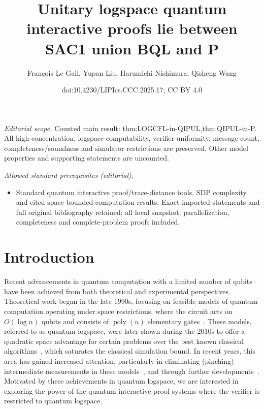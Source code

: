 \documentclass[10pt,a4paper]{article}
\title{Unitary logspace quantum interactive proofs lie between SAC1 union BQL and P}
\author{François Le Gall, Yupan Liu, Harumichi Nishimura, Qisheng Wang}
\date{doi:10.4230/LIPIcs.CCC.2025.17; CC BY 4.0}
\numberwithin{equation}{section}
\numberwithin{figure}{section}
\DeclareMathOperator\poly{poly}
\begin{document}
\maketitle
\noindent\textit{Editorial scope.} Counted main result: thm:LOGCFL-in-QIPUL,thm:QIPUL-in-P. All high-concentration, logspace-computability, verifier-uniformity, message-count, completeness/soundness and simulator restrictions are preserved. Other model properties and supporting statements are uncounted.\par\medskip
\noindent\textit{Allowed standard prerequisites (editorial).}\begin{itemize}
\item Standard quantum interactive proof/trace-distance tools, SDP complexity and cited space-bounded computation results. Exact imported statements and full original bibliography retained; all local snapshot, parallelization, completeness and complete-problem proofs included.
\end{itemize}\medskip
\section{Introduction}

Recent advancements in quantum computation with a limited number of qubits have been achieved from both theoretical and experimental perspectives. Theoretical work began in the late 1990s, focusing on feasible models of quantum computation operating under space restrictions, where the circuit acts on $O(\log n)$ qubits and consists of $\poly(n)$ elementary gates~\cite{Wat99,Wat03}. These models, referred to as quantum logspace, were later shown during the 2010s to offer a quadratic space advantage for certain problems over the best known classical algorithms~\cite{TS13,FL18}, which saturates the classical simulation bound. In recent years, this area has gained increased attention, particularly in eliminating (pinching) intermediate measurements in these models~\cite{FR21,GRZ21}, and through further developments~\cite{GR22,Zhandry24}. Motivated by these achievements in quantum logspace, we are interested in exploring the power of the quantum interactive proof systems where the verifier is restricted to quantum logspace. 
\end{document}
